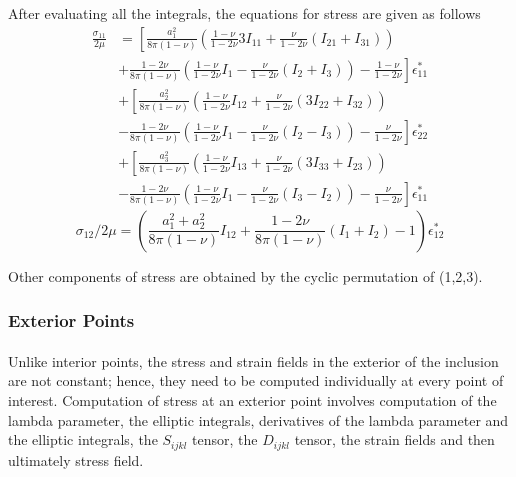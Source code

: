 \documentclass[12pt, a4paper]{report}
\begin{document}
After evaluating all the integrals, the equations for stress are given as follows
\begin{align}
    \frac{\sigma_{11}}{2\mu} &= \left[\frac{a_{1}^{2}}{8\pi (1-\nu)} \left(\frac{1 - \nu}{1 - 2\nu}3I_{11} + \frac{\nu}{1-2\nu}(I_{21} + I_{31})\right) \right. \nonumber \\
    &+  \left. \frac{1-2\nu}{8\pi (1-\nu)} \left( \frac{1-\nu}{1-2\nu}I_1 - \frac{\nu}{1-2\nu}(I_2 + I_3)\right)  -\frac{1-\nu}{1-2\nu} \right] \epsilon_{11}^{*} \nonumber \\
    &+ \left[\frac{a_{2}^{2}}{8\pi (1-\nu)} \left(\frac{1 - \nu}{1 - 2\nu}I_{12} + \frac{\nu}{1-2\nu}(3I_{22} + I_{32})\right) \right. \nonumber \\
    &-  \left. \frac{1-2\nu}{8\pi (1-\nu)} \left( \frac{1-\nu}{1-2\nu}I_1 - \frac{\nu}{1-2\nu}(I_2 - I_3)\right)  -\frac{\nu}{1-2\nu} \right] \epsilon_{22}^{*} \nonumber \\
    &+ \left[\frac{a_{3}^{2}}{8\pi (1-\nu)} \left(\frac{1 - \nu}{1 - 2\nu}I_{13} + \frac{\nu}{1-2\nu}(3I_{33} + I_{23})\right) \right. \nonumber \\
    &-  \left. \frac{1-2\nu}{8\pi (1-\nu)} \left( \frac{1-\nu}{1-2\nu}I_1 - \frac{\nu}{1-2\nu}(I_3 - I_2)\right)  -\frac{\nu}{1-2\nu} \right] \epsilon_{11}^{*}
\end{align}
\begin{equation}
    \sigma_{12}/2\mu = \left( \frac{a_{1}^{2} + a_{2}^{2}}{8\pi (1-\nu)}I_{12} + \frac{1-2\nu}{8\pi (1-\nu)}(I_1 + I_2) -1 \right) \epsilon_{12}^{*}
\end{equation}

Other components of stress are obtained by the cyclic permutation of (1,2,3).

\subsubsection{Exterior Points}
\paragraph{}
Unlike interior points, the stress and strain fields in the exterior of the inclusion are not constant; hence, they need to be computed individually at every point of interest. Computation of stress at an exterior point involves computation of the lambda parameter, the elliptic integrals, derivatives of the lambda parameter and the elliptic integrals, the $S_{ijkl}$ tensor, the $D_{ijkl}$ tensor, the strain fields and then ultimately stress field. \\
\end{document}
